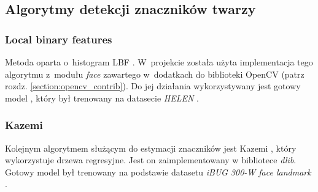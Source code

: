 \subsection{Algorytmy detekcji znaczników twarzy}

\subsubsection{Local binary features}
Metoda oparta o~histogram LBF \cite{lbpFacemark}. W~projekcie została użyta implementacja tego algorytmu z~modułu \textit{face} \cite{opencvcontribface} zawartego w~dodatkach do biblioteki OpenCV (patrz rozdz. \ref{section:opencv_contrib}). Do jej działania wykorzystywany jest gotowy model \cite{lbpfacemarkmodel}, który był trenowany na datasecie \textit{HELEN} \cite{helen_dataset}.


\subsubsection{Kazemi}

Kolejnym algorytmem służącym do estymacji znaczników jest Kazemi \cite{kazemi}, który wykorzystuje drzewa regresyjne. Jest on zaimplementowany w bibliotece \textit{dlib}. Gotowy model był trenowany na podstawie datasetu \textit{iBUG 300-W face landmark} \cite{300Ibugdataset}.


